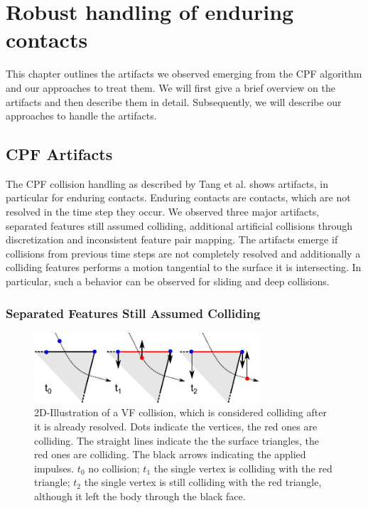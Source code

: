 \chapter{Robust handling of enduring contacts}
\label{ch:RobustHandlingofSlidingContacts}
This chapter outlines the artifacts we observed emerging from the CPF algorithm \cite{TANG2012} and our approaches to treat them. We will first give a brief overview on the artifacts and then describe them in detail. Subsequently, we will describe our approaches to handle the artifacts.

\section{CPF Artifacts}
\label{sec::CPFArtifacts}
The CPF collision handling as described by Tang et al. \cite{TANG2012} shows artifacts, in particular for enduring contacts. Enduring contacts are contacts, which are not resolved in the time step they occur. We observed three major artifacts, separated features still assumed colliding, additional artificial collisions through discretization and inconsistent feature pair mapping. The artifacts emerge if collisions from previous time steps are not completely resolved and additionally a colliding features performs a motion tangential to the surface it is intersecting. In particular, such a behavior can be observed for sliding and deep collisions.

\subsection{Separated Features Still Assumed Colliding}
\label{ss:ResolvedCollisionsRemain}

\begin{figure}[h!] 
  \centering
     \includegraphics[width=0.75\textwidth]{pics/pdf/slidingVertexArtifactUnresolvedCollision.pdf}
  \caption[2D-Illustration of a VF collision, which is considered colliding after it is already resolved]{2D-Illustration of a VF collision, which is considered colliding after it is already resolved. Dots indicate the vertices, the red ones are colliding. The straight lines indicate the the surface triangles, the red ones are colliding. The black arrows indicating the applied impulses.  $t_0$ no collision; $t_1$ the single vertex is colliding with the red triangle; $t_2$ the single vertex is still colliding with the red triangle, although it left the body through the black face.}
  \label{fig:slidingVertexArtifactUnresolvedCollision}
\end{figure}

